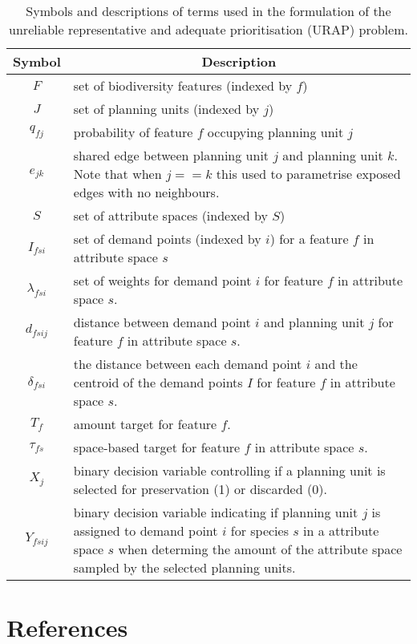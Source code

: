 \documentclass[11pt,]{article}
\begin{document}
\begin{table}[H]
\caption{Symbols and descriptions of terms used in the formulation of the unreliable representative and adequate prioritisation (URAP) problem.\label{term.DF}} 
\begin{center}
\begin{tabular}{cl}
\toprule[1pt]
\multicolumn{1}{c}{Symbol}&\multicolumn{1}{c}{Description}\tabularnewline
\midrule
$F$&\parbox[t][][t]{15cm}{set of biodiversity features (indexed by $f$)}\tabularnewline
$J$&\parbox[t][][t]{15cm}{set of planning units (indexed by $j$)}\tabularnewline
$q_{fj}$&\parbox[t][][t]{15cm}{probability of feature $f$ occupying planning unit $j$}\tabularnewline
$e_{jk}$&\parbox[t][][t]{15cm}{shared edge between planning unit $j$ and planning unit $k$. Note that when $j==k$ this used to parametrise exposed edges with no neighbours.}\tabularnewline
$S$&\parbox[t][][t]{15cm}{set of attribute spaces (indexed by $S$)}\tabularnewline
$I_{fsi}$&\parbox[t][][t]{15cm}{set of demand points (indexed by $i$) for a feature $f$ in attribute space $s$}\tabularnewline
$\lambda_{fsi}$&\parbox[t][][t]{15cm}{set of weights for demand point $i$ for feature $f$ in attribute space $s$.}\tabularnewline
$d_{fsij}$&\parbox[t][][t]{15cm}{distance between demand point $i$ and planning unit $j$ for feature $f$ in attribute space $s$.}\tabularnewline
$\delta_{fsi}$&\parbox[t][][t]{15cm}{the distance between each demand point $i$ and the centroid of the demand points $I$ for feature $f$ in attribute space $s$.}\tabularnewline
$T_f$&\parbox[t][][t]{15cm}{amount target for feature $f$.}\tabularnewline
$\tau_{fs}$&\parbox[t][][t]{15cm}{space-based target for feature $f$ in attribute space $s$.}\tabularnewline
$X_j$&\parbox[t][][t]{15cm}{binary decision variable controlling if a planning unit is selected for preservation (1) or discarded (0).}\tabularnewline
$Y_{fsij}$&\parbox[t][][t]{15cm}{binary decision variable indicating if planning unit $j$ is assigned to demand point $i$ for species $s$ in a attribute space $s$ when determing the amount of the attribute space sampled by the selected planning units.}\tabularnewline
\bottomrule[1pt]
\end{tabular}\end{center}

\end{table}

\section{References}\label{references}
\end{document}
